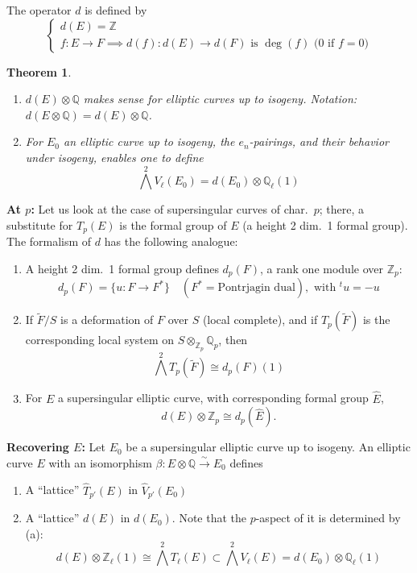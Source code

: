 \documentclass[11pt,a4paper]{article}
\theoremstyle{plain}
\newtheorem{theorem}{Theorem}[section]
\theoremstyle{definition}
\theoremstyle{remark}
\newcommand{\Q}{\mathbb{Q}}
\newcommand{\Z}{\mathbb{Z}}
\newcommand{\Zp}{\mathbb{Z}_{p}}
\newcommand{\Qp}{\mathbb{Q}_{p}}
\newcommand{\Zl}{\mathbb{Z}_{\ell}}
\newcommand{\Ql}{\mathbb{Q}_{\ell}}
\newcommand{\Tp}{T_{p}}
\newcommand{\Vl}{V_{\ell}}
\newcommand{\Tl}{T_{\ell}}
\begin{document}
The operator $d$ is defined by
\[
\begin{cases}
d(E) = \Z \\
f : E \to F \implies d(f) : d(E) \to d(F) \text{ is } \deg(f) \text{ (0 if } f = 0\text{)}
\end{cases}
\]

\begin{theorem}
\begin{enumerate}[label=(\alph*)]
\item $d(E) \otimes \Q$ makes sense for elliptic curves up to isogeny. Notation: $d(E \otimes \Q) = d(E) \otimes \Q$.

\item For $E_{0}$ an elliptic curve up to isogeny, the $e_{n}$-pairings, and their behavior under isogeny, enables one to define
\[
\bigwedge^{2} \Vl(E_{0}) = d(E_{0}) \otimes \Ql(1)
\]
\end{enumerate}
\end{theorem}

\noindent
\textbf{At $p$:} Let us look at the case of supersingular curves of char.\ $p$; there, a substitute for $\Tp(E)$ is the formal group of $E$ (a height 2 dim.\ 1 formal group). The formalism of $d$ has the following analogue:
\begin{enumerate}[label=(\alph*)]
\item A height 2 dim.\ 1 formal group defines $d_{p}(F)$, a rank one module over $\Zp$:
\[
d_{p}(F) = \{u : F \to F^{*}\} \quad (F^{*} = \text{Pontrjagin dual}), \text{ with } {}^{t}u = -u
\]
\item If $\widetilde{F}/S$ is a deformation of $F$ over $S$ (local complete), and if $\Tp(\widetilde{F})$ is the corresponding local system on $S \otimes_{\Zp} \Qp$, then
\[
\bigwedge^{2} \Tp(\widetilde{F}) \cong d_{p}(F)(1)
\]
\item For $E$ a supersingular elliptic curve, with corresponding formal group $\widehat{E}$,
\[
d(E) \otimes \Zp \cong d_{p}(\widehat{E}).
\]
\end{enumerate}

\noindent
\textbf{Recovering $E$:} Let $E_{0}$ be a supersingular elliptic curve up to isogeny. An elliptic curve $E$ with an isomorphism $\beta : E \otimes \Q \xrightarrow{\sim} E_{0}$ defines
\begin{enumerate}[label=(\alph*)]
\item A ``lattice'' $\widehat{T}_{p'}(E)$ in $\widehat{V}_{p'}(E_{0})$
\item A ``lattice'' $d(E)$ in $d(E_{0})$. Note that the $p$-aspect of it is determined by (a):
\[
d(E) \otimes \Zl(1) \cong \bigwedge^{2} \Tl(E) \subset \bigwedge^{2} \Vl(E) = d(E_{0}) \otimes \Ql(1)
\]
\end{enumerate}
\end{document}
